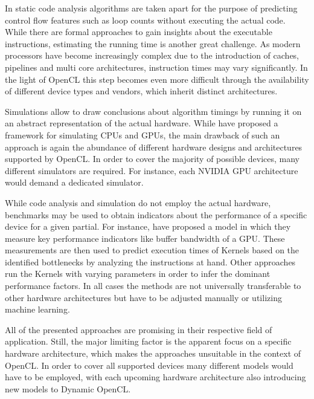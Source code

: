 In static code analysis algorithms are taken apart for the purpose of predicting control flow features such as loop counts without executing the actual code\cite{loopbound}\cite{sweet}. While there are formal approaches to gain insights about the executable instructions, estimating the running time is another great challenge. As modern processors have become increasingly complex due to the introduction of caches, pipelines and multi core architectures, instruction times may vary significantly\cite{wcet}. In the light of OpenCL this step becomes even more difficult through the availability of different device types and vendors, which inherit distinct architectures.

Simulations allow to draw conclusions about algorithm timings by running it on an abstract representation of the actual hardware\cite{wcet}. While \citeauthor{multi2sim} have proposed a framework for simulating CPUs and GPUs\cite{multi2sim}, the main drawback of such an approach is again the abundance of different hardware designs and architectures supported by OpenCL. In order to cover the majority of possible devices, many different simulators are required. For instance, each NVIDIA GPU architecture would demand a dedicated simulator.

While code analysis and simulation do not employ the actual hardware, benchmarks may be used to obtain indicators about the performance of a specific device for a given partial. For instance, \citeauthor{quantitative_performance} have proposed a model in which they measure key performance indicators like buffer bandwidth of a GPU\cite{quantitative_performance}. These measurements are then used to predict execution times of Kernels based on the identified bottlenecks by analyzing the instructions at hand. Other approaches run the Kernels with varying parameters in order to infer the dominant performance factors\cite{gpgpu_performance}. In all cases the methods are not universally transferable to other hardware architectures but have to be adjusted manually or utilizing machine learning.

All of the presented approaches are promising in their respective field of application. Still, the major limiting factor is the apparent focus on a specific hardware architecture, which makes the approaches unsuitable in the context of OpenCL. In order to cover all supported devices many different models would have to be employed, with each upcoming hardware architecture also introducing new models to Dynamic OpenCL. 

